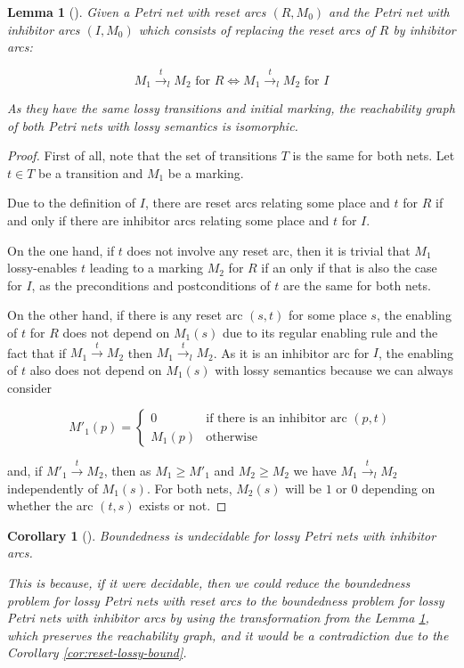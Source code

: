 \documentclass{article}
\newtheorem{lemma}{Lemma}
\newtheorem{corollary}{Corollary}
\begin{document}
\begin{lemma}[]\label{lem:iso}
  Given a Petri net with reset arcs $(R, M_0)$ and the Petri net 
  with inhibitor arcs $(I, M_0)$ which consists of replacing the
  reset arcs of $R$ by inhibitor arcs:

  $$
    M_1 \stackrel{t}{\rightarrow}_l M_2 \text{ for } R \iff 
    M_1 \stackrel{t}{\rightarrow}_l M_2 \text{ for } I
  $$

  As they have the same lossy transitions and initial marking, the 
  reachability graph of both Petri nets with lossy semantics is 
  isomorphic.
\end{lemma}
\begin{proof}
First of all, note that the set of transitions $T$ is the same for both 
nets. Let $t \in T$ be a transition and $M_1$ be a marking.

Due to the definition of $I$, there are reset arcs relating some place 
and $t$ for $R$ if and only if there are inhibitor arcs relating some place 
and $t$ for $I$.

On the one hand, if $t$ does not involve any reset arc, then it is trivial that 
$M_1$ lossy-enables $t$ leading to a marking $M_2$ for $R$ if an 
only if that is also the case for $I$, as the preconditions and 
postconditions of $t$ are the same for both nets.

On the other hand, if there is any reset arc $(s, t)$ for some place $s$, the enabling 
of $t$ for $R$ does not depend on $M_1(s)$ due to its regular enabling rule and the 
fact that if $M_1 \stackrel{t}{\rightarrow} M_2$ then 
$M_1 \stackrel{t}{\rightarrow}_l M_2$. As it is an
inhibitor arc for $I$, the enabling of $t$ also does not depend on
$M_1(s)$ with lossy semantics because we can always consider

$$
M'_1(p) = 
\begin{cases}
  0 &\text{if there is an inhibitor arc } (p, t) \\
  M_1(p) &\text{otherwise}
\end{cases}
$$

and, if $M'_1 \stackrel{t}{\rightarrow} M_2$, then
as $M_1 \geq M'_1$ and $M_2 \geq M_2$ we have
$M_1 \stackrel{t}{\rightarrow}_l M_2$ independently of
$M_1(s)$. For both nets, $M_2(s)$ will be $1$ or $0$ depending on whether the arc 
$(t, s)$ exists or not.
\end{proof}

\begin{corollary}[]\label{cor:inhib-lossy-bound}
  Boundedness is undecidable for lossy Petri nets with inhibitor 
  arcs.

  This is because, if it were decidable, then we could reduce
  the boundedness problem for lossy Petri nets with reset
  arcs to the boundedness problem for lossy Petri nets with 
  inhibitor arcs by using the transformation from the Lemma 
  \ref{lem:iso}, which preserves the reachability graph,
  and it would be a contradiction due to the 
  Corollary \ref{cor:reset-lossy-bound}.
\end{corollary}
\end{document}
